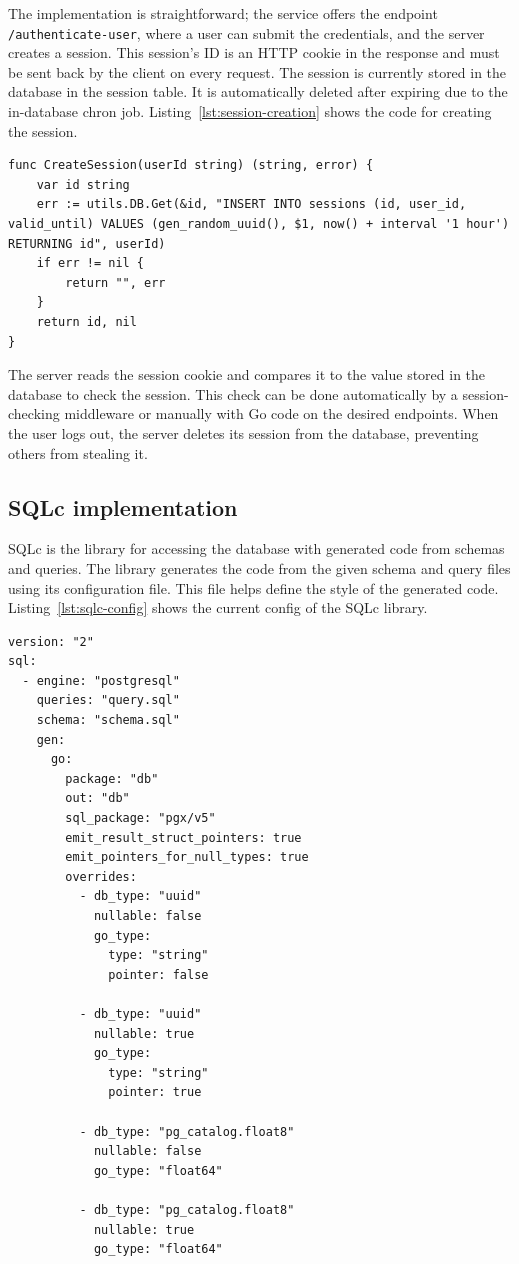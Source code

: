 The implementation is straightforward; the service offers the endpoint \texttt{/authenticate-user}, where a user can submit the credentials, and the server creates a session. This session's ID is an HTTP cookie in the response and must be sent back by the client on every request. The session is currently stored in the database in the session table. It is automatically deleted after expiring due to the in-database chron job. Listing~\ref{lst:session-creation} shows the code for creating the session.

\begin{lstlisting}[caption=Session creation code,label=lst:session-creation]
func CreateSession(userId string) (string, error) {
	var id string
	err := utils.DB.Get(&id, "INSERT INTO sessions (id, user_id, valid_until) VALUES (gen_random_uuid(), $1, now() + interval '1 hour') RETURNING id", userId)
	if err != nil {
		return "", err
	}
	return id, nil
}
\end{lstlisting}

The server reads the session cookie and compares it to the value stored in the database to check the session. This check can be done automatically by a session-checking middleware or manually with Go code on the desired endpoints. When the user logs out, the server deletes its session from the database, preventing others from stealing it.

\subsection{SQLc implementation}

SQLc is the library for accessing the database with generated code from schemas and queries. The library generates the code from the given schema and query files using its configuration file. This file helps define the style of the generated code. Listing~\ref{lst:sqlc-config} shows the current config of the SQLc library.

\begin{lstlisting}[caption=SQLc configuration,label=lst:sqlc-config]
version: "2"
sql:
  - engine: "postgresql"
    queries: "query.sql"
    schema: "schema.sql"
    gen:
      go:
        package: "db"
        out: "db"
        sql_package: "pgx/v5"
        emit_result_struct_pointers: true
        emit_pointers_for_null_types: true
        overrides:
          - db_type: "uuid"
            nullable: false
            go_type:
              type: "string"
              pointer: false

          - db_type: "uuid"
            nullable: true
            go_type:
              type: "string"
              pointer: true

          - db_type: "pg_catalog.float8"
            nullable: false
            go_type: "float64"

          - db_type: "pg_catalog.float8"
            nullable: true
            go_type: "float64"

\end{lstlisting}

